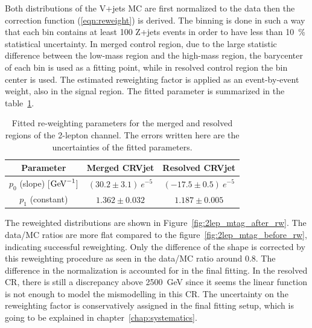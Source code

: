 Both distributions of the V+jets MC are first normalized to the data then the correction function (\ref{eqn:reweight}) is derived. 
The binning is done in such a way that each bin contains at least 100 Z+jets events in order to have less than 10~\% statistical uncertainty. 
In merged control region, due to the large statistic difference between the low-mass region and the high-mass region, the barycenter of each bin is used as a fitting point, while in resolved control region the bin center is used.
The estimated reweighting factor is applied as an event-by-event weight, also in the signal region.
The fitted parameter is summarized in the table~\ref{tab:fit}. 
\begin{table}[htbp]
 \footnotesize
\begin{center}
\begin{tabular}{ | c | c | c |}
\hline
Parameter & Merged CRVjet & Resolved CRVjet  \\
\hline
$p_{0}$ (slope) [$\mathrm{GeV}^{-1}$] & $(30.2 \pm 3.1)~e^{-5}$ &  $(-17.5 \pm 0.5)~e^{-5}$ \\
 \hline
$p_{1}$ (constant)  & $1.362 \pm 0.032$ & $1.187 \pm 0.005$ \\
\hline
\end{tabular}
\caption{\label{tab:fit} Fitted re-weighting parameters for the merged and resolved regions of the 2-lepton channel. The errors written here are the uncertainties of the fitted parameters. }
  \end{center}
\end{table}
The reweighted distributions are shown in Figure~\ref{fig:2lep_mtag_after_rw}. 
The data/MC ratios are more flat compared to the figure~\ref{fig:2lep_mtag_before_rw}, indicating successful reweighting.
Only the difference of the shape is corrected by this reweighting procedure as seen in the data/MC ratio around 0.8. 
The difference in the normalization is accounted for in the final fitting.
In the resolved CR, there is still a discrepancy above 2500~GeV since it seems the linear function is not enough to model the mismodelling in this CR.
The uncertainty on the reweighting factor is conservatively assigned in the final fitting setup, which is going to be explained in chapter~\ref{chap:systematics}.
